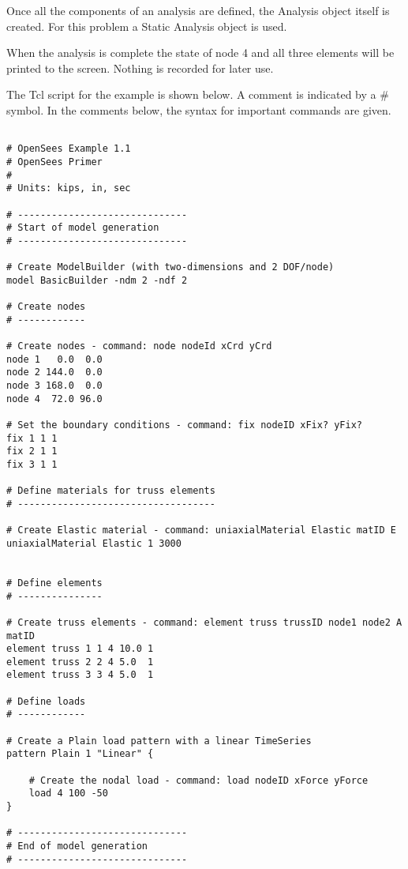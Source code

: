\documentclass[12pt]{article}
\begin{document}
Once all the components of an analysis are defined, the Analysis
object itself is created.  For this problem a Static Analysis object
is used.


\vspace{0.2in} 

When the analysis is complete the state of node 4 and all three elements
will be printed to the screen. Nothing is recorded for later use.

\vspace{0.2in} 

The Tcl script for the example is shown below.  A comment is indicated
by a \# symbol. In the comments below, the syntax for important
commands are given.

{\sf\small
\begin{verbatim}

# OpenSees Example 1.1
# OpenSees Primer
#
# Units: kips, in, sec

# ------------------------------
# Start of model generation
# ------------------------------

# Create ModelBuilder (with two-dimensions and 2 DOF/node)
model BasicBuilder -ndm 2 -ndf 2

# Create nodes
# ------------

# Create nodes - command: node nodeId xCrd yCrd
node 1   0.0  0.0
node 2 144.0  0.0
node 3 168.0  0.0
node 4  72.0 96.0

# Set the boundary conditions - command: fix nodeID xFix? yFix?
fix 1 1 1 
fix 2 1 1
fix 3 1 1

# Define materials for truss elements
# -----------------------------------

# Create Elastic material - command: uniaxialMaterial Elastic matID E
uniaxialMaterial Elastic 1 3000


# Define elements
# ---------------

# Create truss elements - command: element truss trussID node1 node2 A matID
element truss 1 1 4 10.0 1
element truss 2 2 4 5.0  1
element truss 3 3 4 5.0  1

# Define loads
# ------------

# Create a Plain load pattern with a linear TimeSeries
pattern Plain 1 "Linear" {

    # Create the nodal load - command: load nodeID xForce yForce
    load 4 100 -50
}

# ------------------------------
# End of model generation
# ------------------------------


\end{verbatim}}
\end{document}
